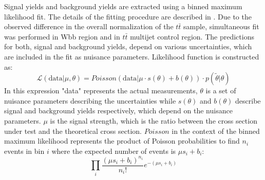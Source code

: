 Signal yields and background yields are extracted using a binned maximum likelihood fit. The details of the fitting procedure are described in \cite{ATL-PHYS-PUB-2011-011}. Due to the observed difference in the overall normalization of the $t\bar{t}$ sample, simultaneous fit was performed in Wbb region and in $t\bar{t}$ multijet control region. 
The predictions for both, signal and background yields, depend on various uncertainties, which are included in the fit as nuisance parameters. Likelihood function is constructed as:
\begin{equation}
\mathcal{L}(\mathrm{data}|\mu,\theta) = Poisson(\mathrm{data}|\mu \cdot s(\theta)+b(\theta))\cdot p(\widetilde{\theta} | \theta) 
\end{equation} 
In this expression "data" represents the actual measurements, $\theta$ is a set of nuisance parameters describing the uncertainties while $s(\theta)$ and $b(\theta)$ describe signal and background yields respectively, which depend on the nuisance parameters. $\mu$ is the signal strength, which is the ratio between the cross section under test and the theoretical cross section. $Poisson$ in the context of the binned maximum likelihood represents the product of Poisson probabilities to find $n_i$ events in bin $i$ where the expected number of events is $\mu s_i+b_i$:
\begin{equation}
\prod\limits_{i} \frac{(\mu s_i+b_i)^{n_i}}{n_i!}e^{-(\mu s_i+b_i)}
\end{equation}

